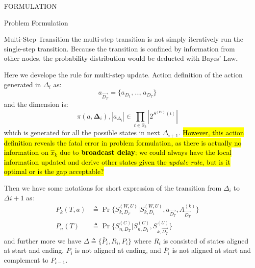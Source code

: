 \documentclass[10pt, conference, letterpaper]{IEEEtran}
\begin{document}
\begin{section}{FORMULATION}
\begin{subsection}{Problem Formulation}
\begin{subsubsection}{Multi-Step Transition}
                the multi-step transition is not simply iteratively run the single-step transition. Because the transition is confined by information from other nodes, the probability distribution would be deducted with Bayes' Law.

                Here we develope the rule for multi-step update.
                Action definition of the action generated in $\Delta_{i}$ as:
                $$
                a_{\vec{D_T}} = \{ a_{D_1}, \dots, a_{D_T} \}
                $$
                and the dimension is:
                $$
                \pi(a, \mathbf{\Delta}_i), |a_{\Delta_i}| \in \prod_{t \in \hat{x}_k} |2^{S^{(W)}(t)}|
                $$
                which is generated for all the possible states in next $\Delta_{i+1}$.
                \hl{However, this action definition reveals the fatal error in problem formulation, as there is actually no information on $\hat{x}_k$ due to \textbf{broadcast delay}; we could always have the local information updated and derive other states given the \emph{update rule}, but is it optimal or is the gap acceptable?}

                Then we have some notations for short expression of the transition from $\Delta_{i}$ to $\Delta{i+1}$ as:
                \begin{align}
                    P_k(T,a) &\triangleq \Pr\{ S^{(W,U)}_{k,D_T}|S^{(W,U)}_{k,D_1}, a_{\vec{D_T}},A^{(k)}_{\vec{D_T} }\}
                    \\
                    P_n(T) &\triangleq \Pr\{ S^{(C)}_{n,D_T}|S^{(C)}_{n,D_1}, S^{(U)}_{k,\vec{D_T}} \}
                \end{align}
                and further more we have $\Delta \triangleq \{ \bar{P}_i, R_i, P_i \}$ where $R_i$ is consisted of states aligned at start and ending, $P_i$ is not aligned at ending, and $\bar{P}_i$ is not aligned at start and complement to $P_{i-1}$.


\end{subsubsection}
\end{subsection}
\end{section}
\end{document}
